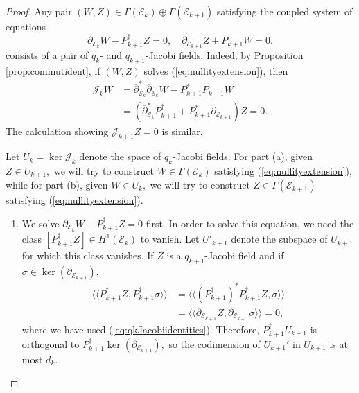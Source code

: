 \documentclass[11pt]{article}
\theoremstyle{definition}
\newcommand{\del}{\partial}
\newcommand{\delbar}{\overline{\partial}}
\newcommand{\llangle}{\langle\!\langle}
\newcommand{\rrangle}{\rangle\!\rangle}
\numberwithin{equation}{section}
\begin{document}
\begin{proof}
    Any pair $(W,Z) \in \Gamma(\mathcal{E}_k) \oplus \Gamma(\mathcal{E}_{k+1})$ satisfying the coupled system of equations
        \begin{equation}\label{eq:nullityextension}
            \delbar_{\mathcal{E}_{k}} W - P^\dagger_{k+1} Z = 0, \quad \del_{\mathcal{E}_{k+1}} Z + P_{k+1} W = 0.
        \end{equation}
    consists of a pair of $q_k$- and $q_{k+1}$-Jacobi fields. Indeed, by Proposition \ref{prop:commutident}, if $(W,Z)$ solves (\ref{eq:nullityextension}), then
        \begin{equation*}
            \begin{aligned}
                \mathcal{J}_k W &= \delbar_{\mathcal{E}_k}^* \delbar_{\mathcal{E}_{k}} W - P_{k+1}^* P_{k+1} W \\
                &= \left( \delbar_{\mathcal{E}_k}^* P^\dagger_{k+1} + P_{k+1}^* \del_{\mathcal{E}_{k+1}} \right)Z = 0.
            \end{aligned}
        \end{equation*}
        The calculation showing $\mathcal{J}_{k+1} Z = 0$ is similar.
    
        Let $U_{k} = \ker \mathcal{J}_k$ denote the space of $q_{k}$-Jacobi fields. For part (a), given $Z \in U_{k+1},$ we will try to construct $W \in \Gamma(\mathcal{E}_k)$ satisfying (\ref{eq:nullityextension}), while for part (b), given $W \in U_k,$ we will try to construct $Z \in \Gamma(\mathcal{E}_{k+1})$ satisfying (\ref{eq:nullityextension}).

        \begin{enumerate}[label=(\alph*)]
        \item We solve $\delbar_{\mathcal{E}_{k}} W - P^\dagger_{k+1} Z = 0$ first. In order to solve this equation, we need the class $[P_{k+1}^\dagger Z] \in H^1(\mathcal{E}_k)$ to vanish. Let $U'_{k+1}$ denote the subspace of $U_{k+1}$ for which this class vanishes. If $Z$ is a $q_{k+1}$-Jacobi field and if $\sigma \in \ker(\del_{\mathcal{E}_{k+1}}),$
        \begin{equation*}
            \begin{aligned}
                \llangle P_{k+1}^\dagger Z, P_{k+1}^\dagger \sigma \rrangle &= \llangle (P_{k+1}^\dagger)^* P_{k+1}^\dagger Z, \sigma \rrangle \\
                &= \llangle \del_{\mathcal{E}_{k+1}} Z, \del_{\mathcal{E}_{k+1}} \sigma \rrangle = 0,
            \end{aligned}
        \end{equation*}
        where we have used (\ref{eq:qkJacobiidentities}). Therefore, $P_{k+1}^\dagger U_{k+1}$ is orthogonal to $P_{k+1}^\dagger \ker(\del_{\mathcal{E}_{k+1}}),$ so the codimension of $U_{k+1}'$ in $U_{k+1}$ is at most $d_k.$


\end{enumerate}
\end{proof}
\end{document}
